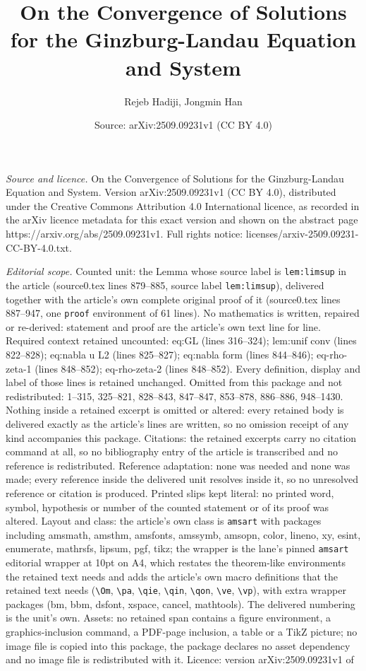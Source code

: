\documentclass[10pt,a4paper]{amsart}
\title[On the Convergence of Solutions for the Ginzburg-Landau Equa]{On the Convergence of Solutions for the Ginzburg-Landau Equation and System}
\author{Rejeb Hadiji, Jongmin Han}
\date{Source: arXiv:2509.09231v1 (CC BY 4.0)}
\begin{document}
\maketitle

\noindent\emph{Source and licence.} On the Convergence of Solutions for the Ginzburg-Landau Equation and System. Version arXiv:2509.09231v1 (CC BY 4.0), distributed under the Creative Commons Attribution 4.0 International licence, as recorded in the arXiv licence metadata for this exact version and shown on the abstract page https://arxiv.org/abs/2509.09231v1. Full rights notice: licenses/arxiv-2509.09231-CC-BY-4.0.txt.\par\smallskip

\noindent\textit{Editorial scope.} Counted unit: the Lemma whose source label is \texttt{lem:limsup} in the article (source0.tex lines 879--885, source label \texttt{lem:limsup}), delivered together with the article's own complete original proof of it (source0.tex lines 887--947, one \texttt{proof} environment of 61 lines). No mathematics is written, repaired or re-derived: statement and proof are the article's own text line for line. Required context retained uncounted: eq:GL (lines 316--324); lem:unif conv (lines 822--828); eq:nabla u L2 (lines 825--827); eq:nabla form (lines 844--846); eq-rho-zeta-1 (lines 848--852); eq-rho-zeta-2 (lines 848--852). Every definition, display and label of those lines is retained unchanged. Omitted from this package and not redistributed: 1--315, 325--821, 828--843, 847--847, 853--878, 886--886, 948--1430. Nothing inside a retained excerpt is omitted or altered: every retained body is delivered exactly as the article's lines are written, so no omission receipt of any kind accompanies this package. Citations: the retained excerpts carry no citation command at all, so no bibliography entry of the article is transcribed and no reference is redistributed. Reference adaptation: none was needed and none was made; every reference inside the delivered unit resolves inside it, so no unresolved reference or citation is produced. Printed slips kept literal: no printed word, symbol, hypothesis or number of the counted statement or of its proof was altered. Layout and class: the article's own class is \texttt{amsart} with packages including amsmath, amsthm, amsfonts, amssymb, amsopn, color, lineno, xy, esint, enumerate, mathrsfs, lipsum, pgf, tikz; the wrapper is the lane's pinned \texttt{amsart} editorial wrapper at 10pt on A4, which restates the theorem-like environments the retained text needs and adds the article's own macro definitions that the retained text needs (\texttt{\textbackslash Om}, \texttt{\textbackslash pa}, \texttt{\textbackslash qie}, \texttt{\textbackslash qin}, \texttt{\textbackslash qon}, \texttt{\textbackslash ve}, \texttt{\textbackslash vp}), with extra wrapper packages (bm, bbm, dsfont, xspace, cancel, mathtools). The delivered numbering is the unit's own. Assets: no retained span contains a figure environment, a graphics-inclusion command, a PDF-page inclusion, a table or a TikZ picture; no image file is copied into this package, the package declares no asset dependency and no image file is redistributed with it. Licence: version arXiv:2509.09231v1 of 
\end{document}
